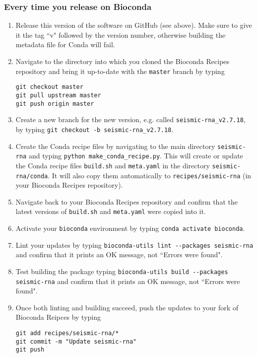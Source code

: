 \documentclass[main.tex]{subfiles}
\begin{document}
 
\subsubsection{Every time you release on Bioconda}

\begin{enumerate}
    \item Release this version of the software on GitHub (see above). Make sure to give it the tag ``v" followed by the version number, otherwise building the metadata file for Conda will fail.
    \item Navigate to the directory into which you cloned the Bioconda Recipes repository and bring it up-to-date with the \verb|master| branch by typing
        \begin{verbatim}
git checkout master
git pull upstream master
git push origin master
        \end{verbatim}
    \item Create a new branch for the new version, e.g. called \verb|seismic-rna_v2.7.18|, by typing \verb|git checkout -b seismic-rna_v2.7.18|.
    \item Create the Conda recipe files by navigating to the main directory \verb|seismic-rna| and typing \verb|python make_conda_recipe.py|. This will create or update the Conda recipe files \verb|build.sh| and \verb|meta.yaml| in the directory \verb|seismic-rna/conda|. It will also copy them automatically to \verb|recipes/seismic-rna| (in your Bioconda Recipes repository).
    \item Navigate back to your Bioconda Recipes repository and confirm that the latest versions of \verb|build.sh| and \verb|meta.yaml| were copied into it.
    \item Activate your \verb|bioconda| environment by typing \verb|conda activate bioconda|.
    \item Lint your updates by typing \verb|bioconda-utils lint --packages seismic-rna| and confirm that it prints an OK message, not ``Errors were found".
    \item Test building the package typing \verb|bioconda-utils build --packages seismic-rna| and confirm that it prints an OK message, not ``Errors were found".
    \item Once both linting and building succeed, push the updates to your fork of Bioconda Reipces by typing
    	\begin{verbatim}
git add recipes/seismic-rna/*
git commit -m "Update seismic-rna"
git push
        \end{verbatim}

\end{enumerate}
\end{document}

